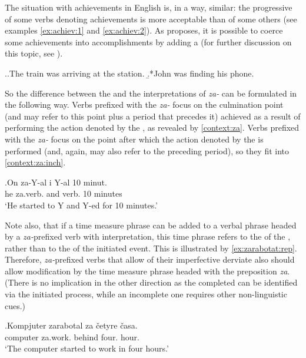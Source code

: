 The situation with achievements in English is, in a way, similar: the progressive of some verbs denoting achievements is more acceptable than of some others (see examples \ref{ex:achiev:1} and \ref{ex:achiev:2}). As \citet{Rothstein:04} proposes, it is possible to coerce some achievements into accomplishments by adding a  (for further discussion on this topic, see \citealt{Gyarmathy:15}).

\ex.\a.\label{ex:achiev:1}The train was arriving at the station.
\b.*John was finding his phone.\label{ex:achiev:2}

So the difference between the  and the  interpretations of \textit{za-} can be formulated in the following way. Verbs prefixed with the  \textit{za-} focus on the culmination point (and may refer to this point plus a period that precedes it) achieved as a result of performing the action denoted by the , as revealed by  \ref{context:za}. Verbs prefixed with the  \textit{za-} focus on the point after which the action denoted by the  is performed (and, again, may also refer to the preceding period), so they fit into  \ref{context:za:inch}.

\exg.\label{context:za:inch}On za-Y-al i Y-al 10 minut.\\
he za.verb. and verb. 10 minutes\\
\trans `He started to Y and Y-ed for 10 minutes.'

Note also, that if a time measure phrase can be added to a verbal phrase headed by a \textit{za-}prefixed verb with  interpretation, this time phrase refers to the  of the , rather than to the  of the initiated event. This is illustrated by \ref{ex:zarabotat:rep}. Therefore,  \textit{za-}prefixed verbs that allow  of their imperfective derviate also should allow modification by the time measure phrase headed with the preposition \textit{za}. (There is no implication in the other direction as the completed  can be identified via the initiated process, while an incomplete one requires other non-linguistic cues.)

\exg.\label{ex:zarabotat:rep}Kompjuter zarabotal za \v{c}etyre \v{c}asa.\\
computer za.work. behind four. hour.\\
\trans `The computer started to work in four hours.'

